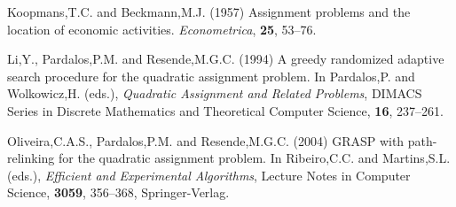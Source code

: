 \documentclass{bioinfo}
\begin{document}
\begin{thebibliography}{}
 Koopmans,T.C. and Beckmann,M.J. (1957) Assignment problems and the location of economic activities. {\it Econometrica}, {\bf 25}, 53--76.

 Li,Y., Pardalos,P.M. and Resende,M.G.C. (1994) A greedy randomized adaptive search procedure for the quadratic assignment problem. In Pardalos,P. and Wolkowicz,H. (eds.), {\it Quadratic Assignment and Related Problems}, DIMACS Series in Discrete Mathematics and Theoretical Computer Science, {\bf 16}, 237--261.

 Oliveira,C.A.S., Pardalos,P.M. and Resende,M.G.C. (2004) GRASP with path-relinking for the quadratic assignment problem. In Ribeiro,C.C. and Martins,S.L. (eds.), {\it Efficient and Experimental Algorithms}, Lecture Notes in Computer Science, {\bf 3059}, 356--368, Springer-Verlag.

\end{thebibliography}
\end{document}
